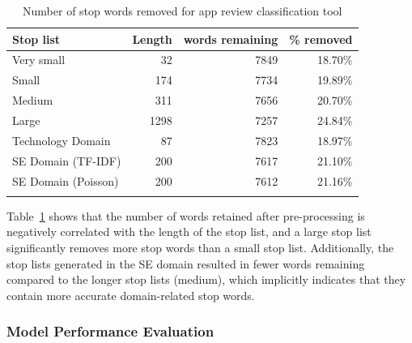 \documentclass[conference]{IEEEtran}
\begin{document}
\begin{sloppy}
\begin{table}[]
\centering
\caption{Number of stop words removed for app review classification tool}
\begin{tabular}{lrrr}
\toprule
Stop list              & Length & words remaining & \% removed \\
\midrule
Very small            & 32     & 7849                                                                                                   & 18.70\%                           \\
Small                 & 174    & 7734                                                                                                   & 19.89\%                           \\
Medium                & 311    & 7656                                                                                                   & 20.70\%                           \\
Large                 & 1298   & 7257                                                                                                   & 24.84\%                           \\
Technology   Domain   & 87     & 7823                                                                                                   & 18.97\%                           \\
SE Domain   (TF-IDF)  & 200    & 7617                                                                                                   & 21.10\%                           \\
SE Domain   (Poisson) & 200    & 7612                                                                                                   & 21.16\%                           \\
\bottomrule
\label{table:two}
\end{tabular}
\end{table}

Table~\ref{table:two} shows that the number of words retained after pre-processing is negatively correlated with the length of the stop list, and a large stop list significantly removes more stop words than a small stop list. Additionally, the stop lists generated in the SE domain resulted in fewer words remaining compared to the longer stop lists (medium), which implicitly indicates that they contain more accurate domain-related stop words. 

\subsubsection{Model Performance Evaluation}


\end{sloppy}
\end{document}
